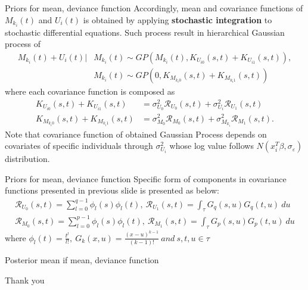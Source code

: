 \documentclass[10pt]{beamer}
\def\mean{M_{k_i}(t)}
\def\dev{U_i(t)}
\begin{document}
\begin{frame}[t]{Priors for mean, deviance function}
\vspace{4pt}
Accordingly, mean and covariance functions of $\mean$ and $\dev$ is obtained by applying \textbf{stochastic integration} to stochastic differential equations. Such process result in hierarchical Gaussian process of
\begin{align*}
\mean +\dev | & \mean \sim GP(\mean , K_{U_{i0}}(s,t)+K_{U_{i1}}(s,t)),\\
	& \mean \sim GP(0 , K_{M_{k_{i}0}}(s,t)+K_{M_{k_{i}1}}(s,t))
\end{align*}
where each covariance function is composed as
\begin{align*}
K_{U_{i0}}(s,t)+K_{U_{i1}}(s,t)& =\sigma^{2}_{U_0}\mathcal{R}_{U_0}(s,t)+\sigma^{2}_{U_i}\mathcal{R}_{U_1}(s,t)\\
K_{M_{k_{i}0}}(s,t)+K_{M_{k_{i}1}}(s,t)& =\sigma^{2}_{M_0}\mathcal{R}_{M_0}(s,t)+\sigma^{2}_{M_{k_i}}\mathcal{R}_{M_1}(s,t).
\end{align*}
Note that covariance function of obtained Gaussian Process depends on covariates of specific individuals through $\sigma^{2}_{U_i}$ whose log value follows $N(x_{i}^{T}\beta, \sigma_{\varepsilon})$ distribution.
\end{frame}


\begin{frame}[t]{Priors for mean, deviance function}
\vspace{4pt}
Specific form of components in covariance functions presented in previous slide is presented as below:
\begin{align*}
\mathcal{R}_{U_0}(s,t)=\sum_{l=0}^{q-1}\phi_{l}(s)\phi_{l}(t),\ \mathcal{R}_{U_1}(s,t)=\int_{\tau}G_q(s,u)G_q(t,u)\ du\\
\mathcal{R}_{M_0}(s,t)=\sum_{l=0}^{p-1}\phi_{l}(s)\phi_{l}(t),\ \mathcal{R}_{M_1}(s,t)=\int_{\tau}G_p(s,u)G_p(t,u)\ du
\end{align*}
where $\displaystyle\phi_l(t)=\frac{t^l}{l!},\ G_k(x,u)=\frac{(x-u)^{k-1}}{(k-1)!}\ and\ s,t,u \in \tau$
\end{frame}


\begin{frame}[t]{Posterior mean if mean, deviance function}
\vspace{4pt}

\end{frame}


\begin{frame}[standout]
\flushleft
Thank you
\end{frame}
\end{document}
